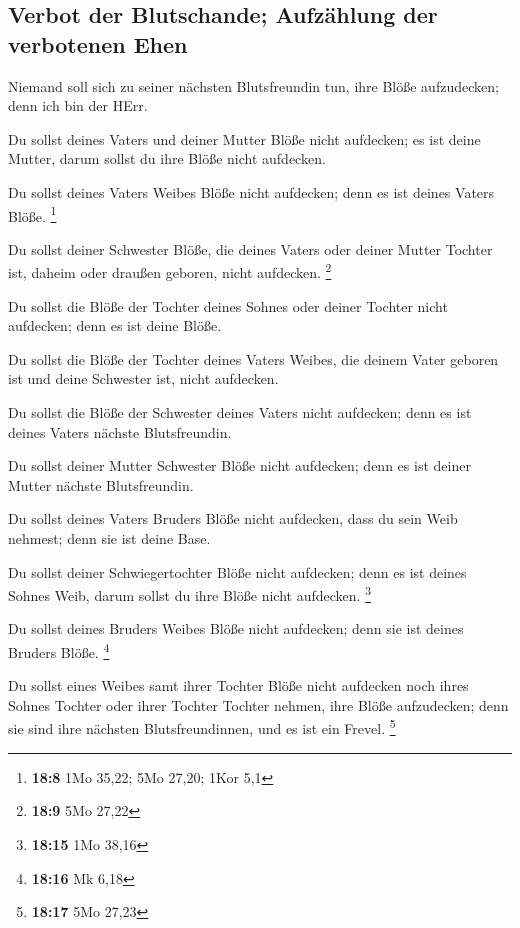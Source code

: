 \hypertarget{verbot-der-blutschande-aufzuxe4hlung-der-verbotenen-ehen}{%
\subsection{Verbot der Blutschande; Aufzählung der verbotenen
Ehen}\label{verbot-der-blutschande-aufzuxe4hlung-der-verbotenen-ehen}}

 Niemand soll sich zu seiner nächsten Blutsfreundin tun,
ihre Blöße aufzudecken; denn ich bin der HErr.

 Du sollst deines Vaters und deiner Mutter Blöße nicht
aufdecken; es ist deine Mutter, darum sollst du ihre Blöße nicht
aufdecken.

 Du sollst deines Vaters Weibes Blöße nicht aufdecken;
denn es ist deines Vaters Blöße. \footnote{\textbf{18:8} 1Mo 35,22; 5Mo
  27,20; 1Kor 5,1}

 Du sollst deiner Schwester Blöße, die deines Vaters oder
deiner Mutter Tochter ist, daheim oder draußen geboren, nicht aufdecken.
\footnote{\textbf{18:9} 5Mo 27,22}

 Du sollst die Blöße der Tochter deines Sohnes oder
deiner Tochter nicht aufdecken; denn es ist deine Blöße.

 Du sollst die Blöße der Tochter deines Vaters Weibes,
die deinem Vater geboren ist und deine Schwester ist, nicht aufdecken.

 Du sollst die Blöße der Schwester deines Vaters nicht
aufdecken; denn es ist deines Vaters nächste Blutsfreundin.

 Du sollst deiner Mutter Schwester Blöße nicht aufdecken;
denn es ist deiner Mutter nächste Blutsfreundin.

 Du sollst deines Vaters Bruders Blöße nicht aufdecken,
dass du sein Weib nehmest; denn sie ist deine Base.

 Du sollst deiner Schwiegertochter Blöße nicht aufdecken;
denn es ist deines Sohnes Weib, darum sollst du ihre Blöße nicht
aufdecken. \footnote{\textbf{18:15} 1Mo 38,16}

 Du sollst deines Bruders Weibes Blöße nicht aufdecken;
denn sie ist deines Bruders Blöße. \footnote{\textbf{18:16} Mk 6,18}

 Du sollst eines Weibes samt ihrer Tochter Blöße nicht
aufdecken noch ihres Sohnes Tochter oder ihrer Tochter Tochter nehmen,
ihre Blöße aufzudecken; denn sie sind ihre nächsten Blutsfreundinnen,
und es ist ein Frevel. \footnote{\textbf{18:17} 5Mo 27,23}

